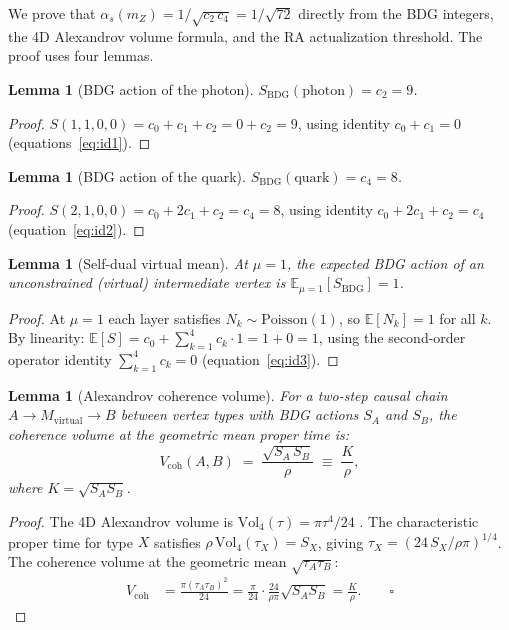 \documentclass[11pt,a4paper]{article}
\newtheorem{lemma}[theorem]{Lemma}
\begin{document}
We prove that $\alpha_s(m_Z) = 1/\sqrt{c_2\,c_4} = 1/\sqrt{72}$
directly from the BDG integers, the 4D Alexandrov volume formula,
and the RA actualization threshold.  The proof uses four lemmas.

\begin{lemma}[BDG action of the photon]
\label{lem:photon_action}
$S_{\mathrm{BDG}}(\text{photon}) = c_2 = 9$.
\end{lemma}
\begin{proof}
$S(1,1,0,0) = c_0 + c_1 + c_2 = 0 + c_2 = 9$, using identity
$c_0 + c_1 = 0$ (equations~\eqref{eq:id1}).
\end{proof}

\begin{lemma}[BDG action of the quark]
\label{lem:quark_action}
$S_{\mathrm{BDG}}(\text{quark}) = c_4 = 8$.
\end{lemma}
\begin{proof}
$S(2,1,0,0) = c_0 + 2c_1 + c_2 = c_4 = 8$, using identity
$c_0 + 2c_1 + c_2 = c_4$ (equation~\eqref{eq:id2}).
\end{proof}

\begin{lemma}[Self-dual virtual mean]
\label{lem:veff}
At $\mu = 1$, the expected BDG action of an unconstrained
(virtual) intermediate vertex is
$\mathbb{E}_{\mu=1}[S_{\mathrm{BDG}}] = 1$.
\end{lemma}
\begin{proof}
At $\mu=1$ each layer satisfies $N_k \sim \mathrm{Poisson}(1)$,
so $\mathbb{E}[N_k]=1$ for all $k$.  By linearity:
$\mathbb{E}[S] = c_0 + \sum_{k=1}^4 c_k \cdot 1 = 1 + 0 = 1$,
using the second-order operator identity $\sum_{k=1}^4 c_k = 0$
(equation~\eqref{eq:id3}).
\end{proof}

\begin{lemma}[Alexandrov coherence volume]
\label{lem:vcoh}
For a two-step causal chain $A \to M_{\mathrm{virtual}} \to B$
between vertex types with BDG actions $S_A$ and $S_B$, the
coherence volume at the geometric mean proper time is:
\begin{equation}
  V_{\mathrm{coh}}(A,B) \;=\; \frac{\sqrt{S_A\,S_B}}{\rho} \;\equiv\; \frac{K}{\rho},
  \label{eq:vcoh_rasm}
\end{equation}
where $K = \sqrt{S_A S_B}$.
\end{lemma}
\begin{proof}
The 4D Alexandrov volume is $\mathrm{Vol}_4(\tau) = \pi\tau^4/24$
\citep{Gibbons2007}.  The characteristic proper time for type $X$ satisfies
$\rho\,\mathrm{Vol}_4(\tau_X) = S_X$, giving
$\tau_X = (24\,S_X/\rho\pi)^{1/4}$.  The coherence volume at the
geometric mean $\sqrt{\tau_A\tau_B}$:
\begin{align*}
  V_{\mathrm{coh}} &= \frac{\pi(\tau_A\tau_B)^2}{24}
  = \frac{\pi}{24}\cdot\frac{24}{\rho\pi}\sqrt{S_A S_B} = \frac{K}{\rho}. \qquad\square
\end{align*}
\end{proof}
\end{document}
